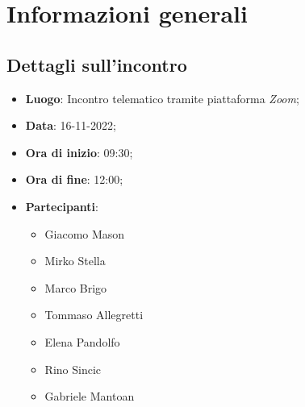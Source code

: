 \section{Informazioni generali}

\subsection{Dettagli sull'incontro}
\begin{itemize}
\item \textbf{Luogo}: Incontro telematico tramite piattaforma \textit{Zoom};
\item \textbf{Data}: 16-11-2022;
\item \textbf{Ora di inizio}: 09:30;
\item \textbf{Ora di fine}: 12:00;
\item \textbf{Partecipanti}: 
\begin{itemize}
	\item Giacomo Mason
	\item Mirko Stella
	\item Marco Brigo
	\item Tommaso Allegretti
	\item Elena Pandolfo
	\item Rino Sincic
	\item Gabriele Mantoan
\end{itemize}
\end{itemize}



